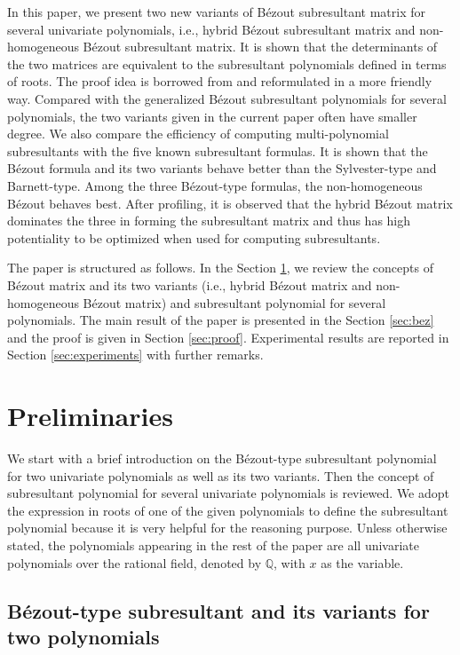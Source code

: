 \documentclass{article}
\begin{document}
In this paper,  we present two new variants of B\'ezout subresultant matrix for several univariate polynomials, i.e., hybrid B\'ezout subresultant matrix and  non-homogeneous B\'ezout subresultant matrix. It is shown that the determinants of the two matrices are equivalent to the subresultant  polynomials defined in terms of roots. The proof idea is borrowed from \cite{hong2021subresultant} and reformulated in a more friendly way.  Compared with the generalized B\'ezout subresultant polynomials for several polynomials, the two variants given in the current paper often have smaller degree. We also compare the efficiency of computing multi-polynomial subresultants with the five known subresultant formulas. It is shown that the B\'ezout formula and its two variants behave better than the Sylvester-type and Barnett-type. Among the three B\'ezout-type formulas, the non-homogeneous B\'ezout behaves best. After profiling, it is observed that the hybrid B\'ezout matrix dominates the three in forming the subresultant matrix and thus has high potentiality to be optimized when used for computing subresultants.

The paper is structured as follows. In the Section \ref{sec:pre}, we review the concepts of B\'ezout matrix and its two variants (i.e., hybrid B\'ezout matrix and non-homogeneous B\'ezout matrix) and subresultant polynomial for several polynomials. The main result of the paper is presented in the Section \ref{sec:bez} and the proof is given in Section \ref{sec:proof}. Experimental results are reported in Section \ref{sec:experiments} with further remarks.

\section{Preliminaries}\label{sec:pre}

We start with a brief introduction on the B\'ezout-type subresultant  polynomial for two univariate polynomials as well as its two variants. Then the concept  of subresultant  polynomial for several univariate polynomials is reviewed. We adopt the expression in roots of one of the given polynomials to define the subresultant
 polynomial because it is very helpful for the reasoning purpose.
Unless otherwise stated, the polynomials appearing in the rest of the paper are all univariate polynomials over the rational field, denoted by $\mathbb{Q}$, with $x$ as the variable.


\subsection{B\'ezout-type subresultant and its variants for two polynomials}
\end{document}
